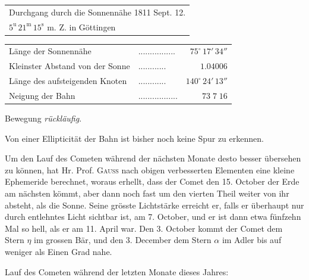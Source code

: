 \begin{center}\fontsize{10}{12}\selectfont\setlength{\tabcolsep}{4pt}\renewcommand{\arraystretch}{1.15}\begin{tabular}{l}
Durchgang durch die Sonnennähe 1811 Sept. 12.\\
\quad $5^{\mathrm u}\,21^{\mathrm m}\,15^{\mathrm s}$ m. Z. in Göttingen\\
\end{tabular}\end{center}
\begin{center}\fontsize{9}{11}\selectfont\setlength{\tabcolsep}{2pt}\renewcommand{\arraystretch}{1.15}\begin{tabular}{llr}
Länge der Sonnennähe & .\;.\;.\;.\;.\;.\;.\;.\;.\;.\;.\;.\;.\;.\;.\;. & $75^\circ\,17'\,34''$\\
Kleinster Abstand von der Sonne & .\;.\;.\;.\;.\;.\;.\;.\;.\;.\;.\;. & $1.04006$\\
Länge des aufsteigenden Knoten & .\;.\;.\;.\;.\;.\;.\;.\;.\;.\;.\;. & $140^\circ\,24'\,13''$\\
Neigung der Bahn & .\;.\;.\;.\;.\;.\;.\;.\;.\;.\;.\;.\;.\;.\;.\;.\;. & $73\;7\;16$\\
\end{tabular}\end{center}
\noindent Bewegung \emph{rückläufig}.

\par\indent Von einer Ellipticität der Bahn ist bisher noch keine Spur zu erkennen.

\par\indent Um den Lauf des Cometen während der nächsten Monate desto besser übersehen zu können, hat Hr. Prof. \textsc{Gauss} nach obigen verbesserten Elementen eine kleine Ephemeride berechnet, woraus erhellt, dass der Comet den 15. October der Erde am nächsten kömmt, aber dann noch fast um den vierten Theil weiter von ihr absteht, als die Sonne. Seine grösste Lichtstärke erreicht er, falls er überhaupt nur durch entlehntes Licht sichtbar ist, am 7. October, und er ist dann etwa fünfzehn Mal so hell, als er am 11. April war. Den 3. October kommt der Comet dem Stern $\eta$ im grossen Bär, und den 3. December dem Stern $\alpha$ im Adler bis auf weniger als Einen Grad nahe.

\noindent Lauf des Cometen während der letzten Monate dieses Jahres:

